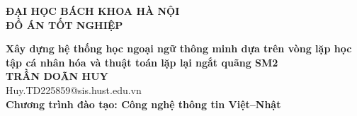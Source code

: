 \documentclass[DoAn.tex]{subfiles}
\begin{document}
\begin{titlepage}
\thispagestyle{empty}
\begin{center}

{\textbf{\large{ĐẠI HỌC BÁCH KHOA HÀ NỘI}}}\\[2cm]

{\textbf{\huge{ ĐỒ ÁN TỐT NGHIỆP}}}\\[1cm]
{\textbf{\Large{Xây dựng hệ thống học ngoại ngữ thông minh dựa trên vòng lặp học tập cá nhân hóa và thuật toán lặp lại ngắt quãng SM2}}\\[1cm]

{\textbf{\large{TRẦN DOÃN HUY}}}\\
{\large{Huy.TD225859@sis.hust.edu.vn}}\\[0.5cm]

{\textbf{\large{Chương trình đào tạo: Công nghệ thông tin Việt--Nhật
}}}\\

\vspace{4cm}
\begin{table}[H]
\centering
{}
\end{table}}
\end{center}



\end{titlepage}
\end{document}

